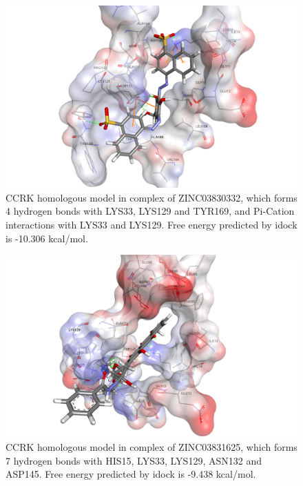 \begin{figure}
\centering
\includegraphics[width=\linewidth]{../ccrk/1HCL-ZINC03830332.png}
\caption{CCRK homologous model in complex of ZINC03830332, which forms 4 hydrogen bonds with LYS33, LYS129 and TYR169, and Pi-Cation interactions with LYS33 and LYS129. Free energy predicted by idock is -10.306 kcal/mol.}
\label{Case:1HCL-ZINC03830332}
\end{figure}

\begin{figure}
\centering
\includegraphics[width=\linewidth]{../ccrk/1HCL-ZINC03831625.png}
\caption{CCRK homologous model in complex of ZINC03831625, which forms 7 hydrogen bonds with HIS15, LYS33, LYS129, ASN132 and ASP145. Free energy predicted by idock is -9.438 kcal/mol.}
\label{Case:1HCL-ZINC03831625}
\end{figure}

\chapterend
